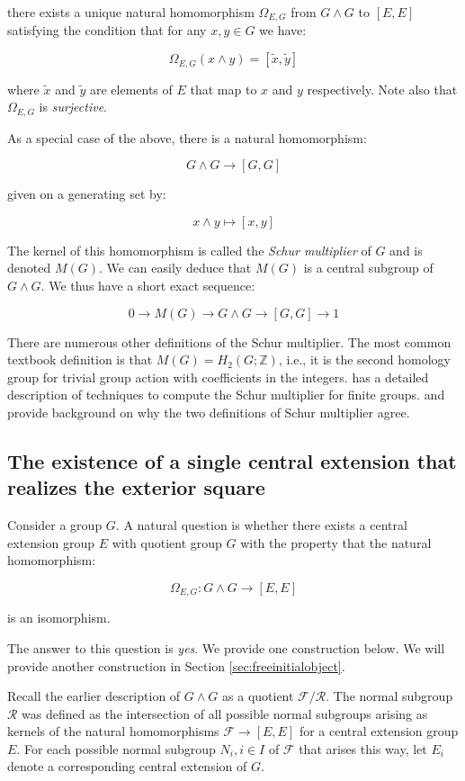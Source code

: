 \documentclass{ucetd}
\begin{document}
there exists a unique natural homomorphism $\Omega_{E,G}$ from $G \wedge G$ to
$[E,E]$ satisfying the condition that for any $x,y \in G$ we have:

$$\Omega_{E,G}(x \wedge y) = [\tilde{x},\tilde{y}]$$

where $\tilde{x}$ and $\tilde{y}$ are elements of $E$ that map to $x$
and $y$ respectively. Note also that $\Omega_{E,G}$ is {\em
  surjective}.

As a special case of the above, there is a natural homomorphism:

$$G \wedge G \to [G,G]$$

given on a generating set by:

$$x \wedge y \mapsto [x,y]$$

The kernel of this homomorphism is called the {\em Schur multiplier}
of $G$ and is denoted $M(G)$. We can easily deduce that $M(G)$ is a
central subgroup of $G \wedge G$. We thus have a short exact sequence:

$$0 \to M(G) \to G \wedge G \to [G,G] \to 1$$

There are numerous other definitions of the Schur multiplier. The most
common textbook definition is that $M(G) = H_2(G;\mathbb{Z})$, i.e.,
it is the second homology group for trivial group action with
coefficients in the integers. \cite{Karpilovsky} has a detailed
description of techniques to compute the Schur multiplier for finite
groups. \cite{BrownLoday} and \cite{McDermottThesis} provide
background on why the two definitions of Schur multiplier agree.

\subsection{The existence of a single central extension that realizes the exterior square}\label{sec:grandcentralproduct}

Consider a group $G$. A natural question is whether there exists a
central extension group $E$ with quotient group $G$ with the property
that the natural homomorphism:

$$\Omega_{E,G}: G \wedge G \to [E,E]$$

is an isomorphism.

The answer to this question is {\em yes}. We provide one construction
below. We will provide another construction in
Section \ref{sec:freeinitialobject}.

Recall the earlier description of $G \wedge G$ as a quotient
$\mathcal{F}/\mathcal{R}$. The normal subgroup $\mathcal{R}$ was
defined as the intersection of all possible normal subgroups arising
as kernels of the natural homomorphisms $\mathcal{F} \to [E,E]$ for a
central extension group $E$. For each possible normal subgroup $N_i, i
\in I$ of $\mathcal{F}$ that arises this way, let $E_i$ denote a
corresponding central extension of $G$.
\end{document}
